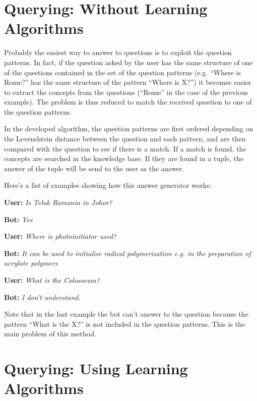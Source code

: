 \documentclass[paper=a4, fontsize=11pt]{scrartcl} %
\numberwithin{equation}{section} %
\numberwithin{figure}{section} %
\numberwithin{table}{section} %
\theoremstyle{definition}
\begin{document}

\section{Querying: Without Learning Algorithms}
\label{section:querying-no-learning-algorithms}

Probably the easiest way to answer to questions is to exploit the question
patterns. In fact, if the question asked by the user has the same structure
of one of the questions contained in the set of the question patterns (e.g.
``Where is Rome?'' has the same structure of the pattern ``Where is X?'') it
becomes easier to extract the concepts from the questions (``Rome'' in the case of
the previous example). The problem is thus reduced to match the received
question to one of the question patterns.

In the developed algorithm, the question patterns are first
ordered depending on the Levenshtein distance between the question and each pattern,
and are then compared with the question to see if there is a match. If a match
is found, the concepts are searched in the knowledge base. If they are found
in a tuple, the answer of the tuple will be send to the user as the answer.

Here's a list of examples showing how this answer generator works:

\textbf{User:} \textit{Is Teluk Ramunia in Johor?}

\textbf{Bot:} \textit{Yes}

\textbf{User:} \textit{Where is photoinitiator used?}

\textbf{Bot:} \textit{It can be used to initialise radical polymerization e.g. in the preparation of acrylate polymers}

\textbf{User:} \textit{What is the Colosseum?}

\textbf{Bot:} \textit{I don't understand.}

Note that in the last example the bot can't answer to the question because
the pattern ``What is the X?'' is not included in the question patterns. This is
the main problem of this method.


\section{Querying: Using Learning Algorithms}
\label{section:querying-with-learning}
\end{document}
